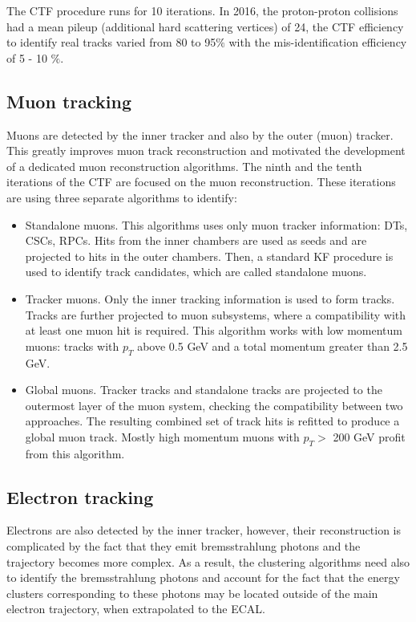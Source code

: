 \begin{small}
The CTF procedure runs for 10 iterations. In 2016, the proton-proton collisions had a mean pileup (additional hard scattering vertices) of 24, the CTF efficiency to identify real tracks varied from 80 to 95$\%$ with the mis-identification efficiency of 5 - 10 $\%$.

\subsection{Muon tracking}\label{sec:muon_track_reconstruction}

Muons are detected by the inner tracker and also by the outer (muon) tracker. This greatly improves muon track reconstruction and motivated the development of a dedicated muon reconstruction algorithms. The ninth and the tenth iterations of the CTF are focused on the muon reconstruction. These iterations are using three separate algorithms to identify: 

\begin{itemize}
\item Standalone muons. This algorithms uses only muon tracker information: DTs, CSCs, RPCs. Hits from the inner chambers are used as seeds and are projected to hits in the outer chambers. Then, a standard KF procedure is used to identify track candidates, which are called standalone muons.
\item Tracker muons. Only the inner tracking information is used to form tracks. Tracks are further projected to muon subsystems, where a compatibility with at least one muon hit is required. This algorithm works with low momentum muons: tracks with $p_T$ above 0.5 GeV and a total momentum greater than 2.5 GeV.
\item Global muons. Tracker tracks and standalone tracks are projected to the outermost layer of the muon system, checking the compatibility between two approaches. The resulting combined set of track hits is refitted to produce a global muon track. Mostly high momentum muons with $p_T > $ 200 GeV profit from this algorithm.
\end{itemize}

\subsection{Electron tracking}\label{sec:ele_track_reconstruction}
Electrons are also detected by the inner tracker, however, their reconstruction is complicated by the fact that they emit bremsstrahlung photons and the trajectory becomes more complex. As a result, the clustering algorithms need also to identify the bremsstrahlung photons and account for the fact that the energy clusters corresponding to these photons may be located outside of the main electron trajectory, when extrapolated to the ECAL. 


\end{small}
